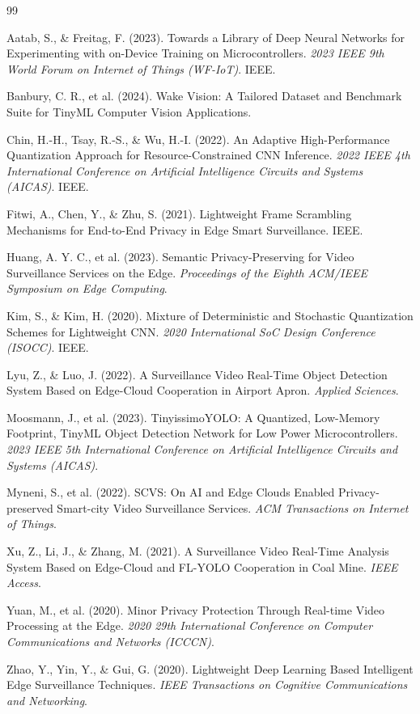 \documentclass[12pt, a4paper]{article}
\begin{document}
\begin{thebibliography}{99}

 Aatab, S., \& Freitag, F. (2023). Towards a Library of Deep Neural Networks for Experimenting with on-Device Training on Microcontrollers. \textit{2023 IEEE 9th World Forum on Internet of Things (WF-IoT)}. IEEE.

 Banbury, C. R., et al. (2024). Wake Vision: A Tailored Dataset and Benchmark Suite for TinyML Computer Vision Applications.

 Chin, H.-H., Tsay, R.-S., \& Wu, H.-I. (2022). An Adaptive High-Performance Quantization Approach for Resource-Constrained CNN Inference. \textit{2022 IEEE 4th International Conference on Artificial Intelligence Circuits and Systems (AICAS)}. IEEE.

 Fitwi, A., Chen, Y., \& Zhu, S. (2021). Lightweight Frame Scrambling Mechanisms for End-to-End Privacy in Edge Smart Surveillance. IEEE.

 Huang, A. Y. C., et al. (2023). Semantic Privacy-Preserving for Video Surveillance Services on the Edge. \textit{Proceedings of the Eighth ACM/IEEE Symposium on Edge Computing}.

 Kim, S., \& Kim, H. (2020). Mixture of Deterministic and Stochastic Quantization Schemes for Lightweight CNN. \textit{2020 International SoC Design Conference (ISOCC)}. IEEE.

 Lyu, Z., \& Luo, J. (2022). A Surveillance Video Real-Time Object Detection System Based on Edge-Cloud Cooperation in Airport Apron. \textit{Applied Sciences}.

 Moosmann, J., et al. (2023). TinyissimoYOLO: A Quantized, Low-Memory Footprint, TinyML Object Detection Network for Low Power Microcontrollers. \textit{2023 IEEE 5th International Conference on Artificial Intelligence Circuits and Systems (AICAS)}.

 Myneni, S., et al. (2022). SCVS: On AI and Edge Clouds Enabled Privacy-preserved Smart-city Video Surveillance Services. \textit{ACM Transactions on Internet of Things}.

 Xu, Z., Li, J., \& Zhang, M. (2021). A Surveillance Video Real-Time Analysis System Based on Edge-Cloud and FL-YOLO Cooperation in Coal Mine. \textit{IEEE Access}.

 Yuan, M., et al. (2020). Minor Privacy Protection Through Real-time Video Processing at the Edge. \textit{2020 29th International Conference on Computer Communications and Networks (ICCCN)}.

 Zhao, Y., Yin, Y., \& Gui, G. (2020). Lightweight Deep Learning Based Intelligent Edge Surveillance Techniques. \textit{IEEE Transactions on Cognitive Communications and Networking}.

\end{thebibliography}
\end{document}
